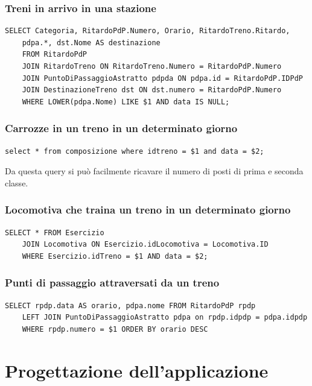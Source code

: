 \documentclass[a4paper,12pt]{report}
\begin{document}
	\subsection{Treni in arrivo in una stazione}
	\begin{verbatim}
SELECT Categoria, RitardoPdP.Numero, Orario, RitardoTreno.Ritardo,
    pdpa.*, dst.Nome AS destinazione
    FROM RitardoPdP
    JOIN RitardoTreno ON RitardoTreno.Numero = RitardoPdP.Numero
    JOIN PuntoDiPassaggioAstratto pdpda ON pdpa.id = RitardoPdP.IDPdP
    JOIN DestinazioneTreno dst ON dst.numero = RitardoPdP.Numero
    WHERE LOWER(pdpa.Nome) LIKE $1 AND data IS NULL;
	\end{verbatim}
	\subsection{Carrozze in un treno in un determinato giorno}
	\begin{verbatim}
select * from composizione where idtreno = $1 and data = $2;
	\end{verbatim}
	\par Da questa query si può facilmente ricavare il numero di posti di prima e seconda classe.
	\subsection{Locomotiva che traina un treno in un determinato giorno}
	\begin{verbatim}
SELECT * FROM Esercizio
    JOIN Locomotiva ON Esercizio.idLocomotiva = Locomotiva.ID
    WHERE Esercizio.idTreno = $1 AND data = $2;
	\end{verbatim}
	\subsection{Punti di passaggio attraversati da un treno}
	\begin{verbatim}
SELECT rpdp.data AS orario, pdpa.nome FROM RitardoPdP rpdp
    LEFT JOIN PuntoDiPassaggioAstratto pdpa on rpdp.idpdp = pdpa.idpdp
    WHERE rpdp.numero = $1 ORDER BY orario DESC
	\end{verbatim}
	\chapter{Progettazione dell'applicazione}
\end{document}
